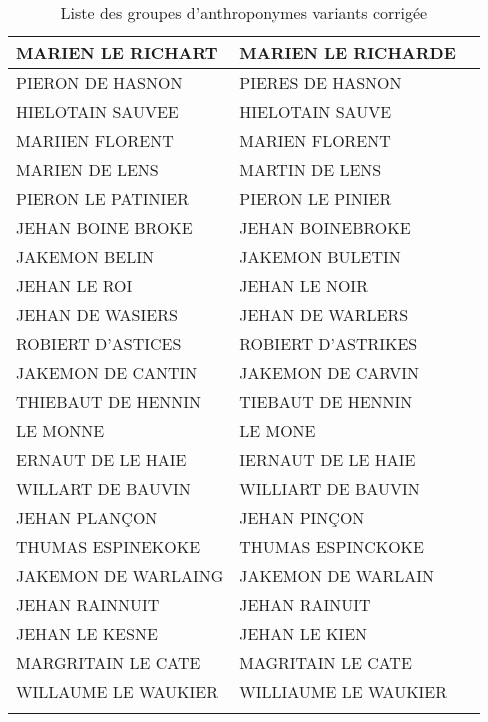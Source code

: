 \begin{center}
\begin{longtable}{|l|l|l|}
\hline		MARIEN LE RICHART	&		 MARIEN LE RICHARDE	&			\\
\hline		PIERON DE HASNON	&		 PIERES DE HASNON	&			\\
\hline		HIELOTAIN SAUVEE	&		 HIELOTAIN SAUVE	&			\\
\hline		MARIIEN FLORENT	&		 MARIEN FLORENT	&			\\
\hline	\rowcolor{lightgray}	MARIEN DE LENS	&		 MARTIN DE LENS	&			\\
\hline	\rowcolor{lightgray}	PIERON LE PATINIER	&		 PIERON LE PINIER	&			\\
\hline		JEHAN BOINE BROKE	&		 JEHAN BOINEBROKE	&			\\
\hline	\rowcolor{lightgray}	JAKEMON BELIN	&		 JAKEMON BULETIN	&			\\
\hline	\rowcolor{lightgray}	JEHAN LE ROI	&		 JEHAN LE NOIR	&			\\
\hline	\rowcolor{lightgray}	JEHAN DE WASIERS	&		 JEHAN DE WARLERS	&			\\
\hline	\rowcolor{lightgray}	ROBIERT D'ASTICES	&		 ROBIERT D'ASTRIKES	&			\\
\hline	\rowcolor{lightgray}	JAKEMON DE CANTIN	&		 JAKEMON DE CARVIN	&			\\
\hline		THIEBAUT DE HENNIN	&		 TIEBAUT DE HENNIN	&			\\
\hline		LE MONNE	&		 LE MONE	&			\\
\hline		ERNAUT DE LE HAIE	&		 IERNAUT DE LE HAIE	&			\\
\hline		WILLART DE BAUVIN	&		 WILLIART DE BAUVIN	&			\\
\hline	\rowcolor{lightgray}	JEHAN PLANÇON	&		 JEHAN PINÇON	&			\\
\hline		THUMAS ESPINEKOKE	&		 THUMAS ESPINCKOKE	&			\\
\hline		JAKEMON DE WARLAING	&		 JAKEMON DE WARLAIN	&			\\
\hline		JEHAN RAINNUIT	&		 JEHAN RAINUIT	&			\\
\hline	\rowcolor{lightgray}	JEHAN LE KESNE	&		 JEHAN LE KIEN	&			\\
\hline		MARGRITAIN LE CATE	&		 MAGRITAIN LE CATE	&			\\
\hline		WILLAUME LE WAUKIER	&		 WILLIAUME LE WAUKIER	&			\\
\hline
    \caption{Liste des groupes d'anthroponymes variants corrigée }
    \label{clustering_corr}
    \end{longtable}
\end{center}
\normalsize